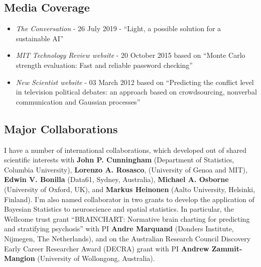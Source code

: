 \documentclass[oneside, a4paper, onecolumn, 10pt]{article}
\newcommand{\myacro}[0]{\name{prism}}
\begin{document}
\subsection*{Media Coverage}



\begin{itemize}
\item {\em The Conversation} - 26 July 2019 - ``Light, a possible solution for a sustainable AI''
\item {\em MIT Technology Review website} - 20 October 2015 based on ``Monte Carlo strength evaluation: Fast and reliable password checking''
\item {\em New Scientist website} - 03 March 2012 based on ``Predicting the conflict level in television political debates: an approach based on crowdsourcing, nonverbal communication and Gaussian processes''
\end{itemize}

\subsection*{Major Collaborations}

I have a number of international collaborations, which developed out of shared scientific interests with {\bf John P. Cunningham} (Department of Statistics, Columbia University), {\bf Lorenzo A. Rosasco}, (University of Genoa and MIT), {\bf Edwin V. Bonilla} (Data61, Sydney, Australia), {\bf Michael A. Osborne} (University of Oxford, UK), and {\bf Markus Heinonen} (Aalto University, Helsinki, Finland).
I'm also named collaborator in two grants to develop the application of Bayesian Statistics to neuroscience and spatial statistics. 
In particular, the Wellcome trust grant ``BRAINCHART: Normative brain charting for predicting and stratifying psychosis'' with PI {\bf Andre Marquand} (Donders Institute, Nijmegen, The Netherlands), and on the Australian Research Council Discovery Early Career Researcher Award (DECRA) grant with PI {\bf Andrew Zammit-Mangion} (University of Wollongong, Australia).
\end{document}
